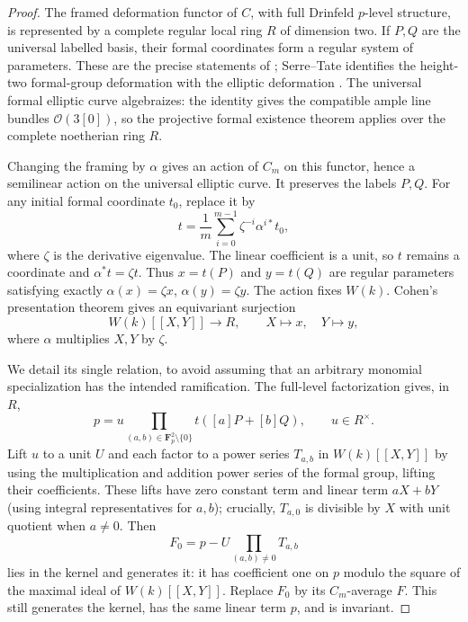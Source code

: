 \begin{proof}
The framed deformation functor of $C$, with full Drinfeld $p$-level
structure, is represented by a complete regular local ring $R$ of
dimension two. If $P,Q$ are the universal labelled basis, their formal
coordinates form a regular system of parameters. These are the
precise statements of \cite[Theorem~2.1.2 and
Proposition~2.2.3(i)]{CarterStrauch2021LubinTate}; Serre--Tate identifies
the height-two formal-group deformation with the elliptic deformation
\cite[Theorem~1.2.1]{Katz1981SerreTate}. The universal formal elliptic
curve algebraizes: the identity gives the compatible ample line
bundles $\mathcal O(3[0])$, so the projective formal existence theorem
applies over the complete noetherian ring $R$.

Changing the framing by $\alpha$ gives an action of $C_m$ on this
functor, hence a semilinear action on the universal elliptic curve.
It preserves the labels $P,Q$. For any initial formal coordinate $t_0$,
replace it by
\[
 t=\frac1m\sum_{i=0}^{m-1}\zeta^{-i}\alpha^{i*}t_0,
\]
where $\zeta$ is the derivative eigenvalue. The linear coefficient is
a unit, so $t$ remains a coordinate and $\alpha^*t=\zeta t$.
Thus $x=t(P)$ and $y=t(Q)$ are regular parameters satisfying exactly
$\alpha(x)=\zeta x$, $\alpha(y)=\zeta y$. The action fixes $W(k)$.
Cohen's presentation theorem gives an equivariant surjection
\[
 W(k)[[X,Y]]\longrightarrow R,\qquad X\mapsto x,\quad Y\mapsto y,
\]
where $\alpha$ multiplies $X,Y$ by $\zeta$.

We detail its single relation, to avoid assuming that an arbitrary
monomial specialization has the intended ramification. The full-level
factorization gives, in $R$,
\[
 p=u\prod_{(a,b)\in\mathbf F_p^2\setminus\{0\}}
          t([a]P+[b]Q),\qquad u\in R^\times.
\]
Lift $u$ to a unit $U$ and each factor to a power series $T_{a,b}$
in $W(k)[[X,Y]]$ by using the multiplication and addition power
series of the formal group, lifting their coefficients. These lifts
have zero constant term and linear term $aX+bY$ (using integral
representatives for $a,b$); crucially, $T_{a,0}$ is divisible by $X$
with unit quotient when $a\ne0$. Then
\[
 F_0=p-U\prod_{(a,b)\ne0}T_{a,b}
\]
lies in the kernel and generates it: it has coefficient one on $p$
modulo the square of the maximal ideal of $W(k)[[X,Y]]$.
Replace $F_0$ by its $C_m$-average $F$. This still generates the kernel,
has the same linear term $p$, and is invariant.


\end{proof}
